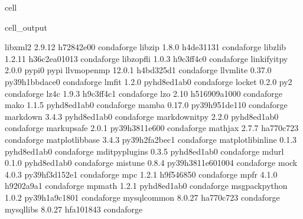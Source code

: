 \documentclass[letterpaper,table,10pt,english]{jupyterBook}
\begin{document}
\begin{sphinxuseclass}{cell}
\begin{sphinxVerbatimOutput}
\begin{sphinxuseclass}{cell_output}
\begin{sphinxVerbatim}[commandchars=\\\{\}]
libxml2                   2.9.12               h72842e0\PYGZus{}0    conda\PYGZhy{}forge
libzip                    1.8.0                h4de3113\PYGZus{}1    conda\PYGZhy{}forge
libzlib                   1.2.11            h36c2ea0\PYGZus{}1013    conda\PYGZhy{}forge
libzopfli                 1.0.3                h9c3ff4c\PYGZus{}0    conda\PYGZhy{}forge
linkify\PYGZhy{}it\PYGZhy{}py             2.0.0                    pypi\PYGZus{}0    pypi
llvm\PYGZhy{}openmp               12.0.1               h4bd325d\PYGZus{}1    conda\PYGZhy{}forge
llvmlite                  0.37.0           py39h1bbdace\PYGZus{}0    conda\PYGZhy{}forge
lmfit                     1.2.0              pyhd8ed1ab\PYGZus{}0    conda\PYGZhy{}forge
locket                    0.2.0                      py\PYGZus{}2    conda\PYGZhy{}forge
lz4\PYGZhy{}c                     1.9.3                h9c3ff4c\PYGZus{}1    conda\PYGZhy{}forge
lzo                       2.10              h516909a\PYGZus{}1000    conda\PYGZhy{}forge
mako                      1.1.5              pyhd8ed1ab\PYGZus{}0    conda\PYGZhy{}forge
mamba                     0.17.0           py39h951de11\PYGZus{}0    conda\PYGZhy{}forge
markdown                  3.4.3              pyhd8ed1ab\PYGZus{}0    conda\PYGZhy{}forge
markdown\PYGZhy{}it\PYGZhy{}py            2.2.0              pyhd8ed1ab\PYGZus{}0    conda\PYGZhy{}forge
markupsafe                2.0.1            py39h3811e60\PYGZus{}0    conda\PYGZhy{}forge
mathjax                   2.7.7                ha770c72\PYGZus{}3    conda\PYGZhy{}forge
matplotlib\PYGZhy{}base           3.4.3            py39h2fa2bec\PYGZus{}1    conda\PYGZhy{}forge
matplotlib\PYGZhy{}inline         0.1.3              pyhd8ed1ab\PYGZus{}0    conda\PYGZhy{}forge
mdit\PYGZhy{}py\PYGZhy{}plugins           0.3.5              pyhd8ed1ab\PYGZus{}0    conda\PYGZhy{}forge
mdurl                     0.1.0              pyhd8ed1ab\PYGZus{}0    conda\PYGZhy{}forge
mistune                   0.8.4           py39h3811e60\PYGZus{}1004    conda\PYGZhy{}forge
mock                      4.0.3            py39hf3d152e\PYGZus{}1    conda\PYGZhy{}forge
mpc                       1.2.1                h9f54685\PYGZus{}0    conda\PYGZhy{}forge
mpfr                      4.1.0                h9202a9a\PYGZus{}1    conda\PYGZhy{}forge
mpmath                    1.2.1              pyhd8ed1ab\PYGZus{}0    conda\PYGZhy{}forge
msgpack\PYGZhy{}python            1.0.2            py39h1a9c180\PYGZus{}1    conda\PYGZhy{}forge
mysql\PYGZhy{}common              8.0.27               ha770c72\PYGZus{}3    conda\PYGZhy{}forge
mysql\PYGZhy{}libs                8.0.27               hfa10184\PYGZus{}3    conda\PYGZhy{}forge

\end{sphinxVerbatim}
\end{sphinxuseclass}
\end{sphinxVerbatimOutput}
\end{sphinxuseclass}
\end{document}
